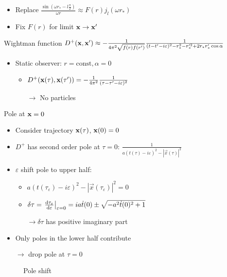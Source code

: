 \documentclass{beamer}
\renewcommand{\va}[1]{\vec{#1}}
\begin{document}
\begin{frame}
\begin{itemize}
	\item Replace \(\frac{\sin(\omega r_* - l\frac{\pi}{2})}{\omega r} \approx F(r) j_l(\omega r_*)\)
	\item Fix \(F(r)\) for limit \(\vb{x} \to \vb{x}'\)
\end{itemize}
\begin{block}{Wightman function}
	\(D^+(\vb{x}, \vb{x}') \approx -\frac{1}{4\pi^2 \sqrt{f(r)f(r')}} \frac{1}{(t-t'-i\varepsilon)^2 - r_*^2 - r_*'^2 + 2r_*r_*' \cos{\alpha}}\)
\end{block}
\begin{itemize}
	\item Static observer: \(r = \mathrm{const}, \alpha = 0\)
	\begin{itemize}
		\item \(D^+(\vb{x}(\tau), \vb{x}(\tau')) =  -\frac{1}{4\pi^2} \frac{1}{(\tau-\tau'-i\varepsilon)^2}\)
		\item[\(\to\)] No particles
	\end{itemize}
\end{itemize}
\end{frame}

\begin{frame}{Pole at \(\vb{x} = 0\)}
\begin{itemize}
	\item Consider trajectory \(\vb{x}(\tau)\), \(\vb{x}(0) = 0\)
	\item \(D^+\) has second order pole at \(\tau = 0\): \(\frac{1}{a(t(\tau)-i\varepsilon)^2 - |\va{x}(\tau)|^2}\)
	\item \(\varepsilon\) shift pole to upper half:
	\begin{itemize}
		\item \(a(t(\tau_\varepsilon)-i\varepsilon)^2 - |\va{x}(\tau_\varepsilon)|^2 = 0\)
		\item \(\delta\tau = \eval{\dv{\tau_\varepsilon}{\varepsilon}}_{\varepsilon = 0} = ia\dot{t}(0) \pm \sqrt{-a^2 \dot{t}(0)^2 + 1}\)
		\item[] \(\to \delta\tau\) has positive imaginary part
	\end{itemize}
	\item Only poles in the lower half contribute 
	\item[] \(\to\) drop pole at \(\tau = 0\)
\end{itemize}
\begin{figure}
\centering
{}
\caption{Pole shift}
\end{figure}
\end{frame}
\end{document}

